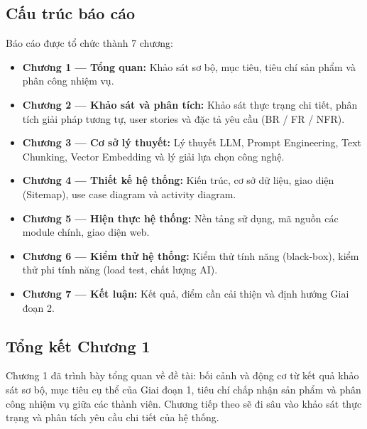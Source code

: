 \subsection{Cấu trúc báo cáo}

Báo cáo được tổ chức thành 7 chương:
\begin{itemize}
    \item \textbf{Chương 1 --- Tổng quan:} Khảo sát sơ bộ, mục tiêu, tiêu
          chí sản phẩm và phân công nhiệm vụ.
    \item \textbf{Chương 2 --- Khảo sát và phân tích:} Khảo sát thực trạng
          chi tiết, phân tích giải pháp tương tự, user stories và đặc tả
          yêu cầu (BR / FR / NFR).
    \item \textbf{Chương 3 --- Cơ sở lý thuyết:} Lý thuyết LLM, Prompt
          Engineering, Text Chunking, Vector Embedding và lý giải lựa chọn
          công nghệ.
    \item \textbf{Chương 4 --- Thiết kế hệ thống:} Kiến trúc, cơ sở dữ liệu,
          giao diện (Sitemap), use case diagram và activity diagram.
    \item \textbf{Chương 5 --- Hiện thực hệ thống:} Nền tảng sử dụng, mã
          nguồn các module chính, giao diện web.
    \item \textbf{Chương 6 --- Kiểm thử hệ thống:} Kiểm thử tính năng
          (black-box), kiểm thử phi tính năng (load test, chất lượng AI).
    \item \textbf{Chương 7 --- Kết luận:} Kết quả, điểm cần cải thiện và
          định hướng Giai đoạn 2.
\end{itemize}

\subsection{Tổng kết Chương 1}

Chương 1 đã trình bày tổng quan về đề tài: bối cảnh và động cơ từ kết quả
khảo sát sơ bộ, mục tiêu cụ thể của Giai đoạn 1, tiêu chí chấp nhận sản
phẩm và phân công nhiệm vụ giữa các thành viên. Chương tiếp theo sẽ đi sâu
vào khảo sát thực trạng và phân tích yêu cầu chi tiết của hệ thống.
